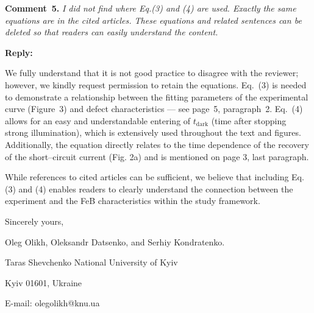 \documentclass{WileyMSP-template}
\begin{document}




\vspace{1cm}
\noindent
\textcolor[rgb]{0.00,0.50,1.00}{\textbf{Comment~5.}}
\emph{ I did not find where Eq.(3) and (4) are used.
Exactly the same equations are in the cited articles.
These equations and related sentences can be deleted so that readers can easily understand the content.}

\noindent
\textcolor[rgb]{0.51,0.00,0.00}{\textbf{Reply:}}

We fully understand that it is not good practice to disagree with the reviewer;
however, we kindly request permission to retain the equations.
Eq.~(3) is needed to demonstrate a relationship between the fitting parameters of the experimental curve
(Figure~3) and defect characteristics --- see page~5, paragraph~2.
Eq.~(4) allows for an easy and understandable entering of $t_\mathrm{dark}$ 
(time after stopping strong illumination), 
which is extensively used throughout the text and figures. 
Additionally, the equation directly relates to the time dependence of the recovery of the short--circuit current (Fig. 2a) 
and is mentioned on page 3, last paragraph.

While references to cited articles can be sufficient, 
we believe that including Eq.(3) and (4) enables readers to clearly understand 
the connection between the experiment and the FeB characteristics within the study framework.





\vspace{3cm}

Sincerely yours,

Oleg Olikh, Oleksandr Datsenko, and Serhiy Kondratenko.


Taras Shevchenko National University of Kyiv


Kyiv 01601, Ukraine

E-mail: olegolikh@knu.ua



\end{document}

